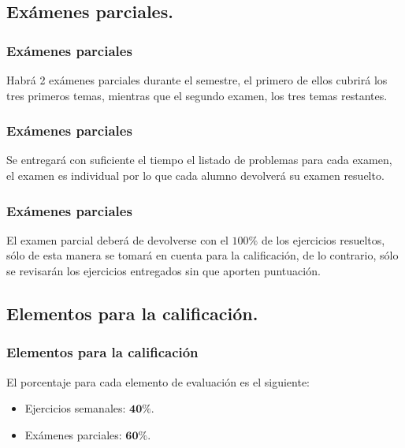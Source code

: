 \subsection{Exámenes parciales.}
\begin{frame}
\frametitle{Exámenes parciales}
Habrá 2 exámenes parciales durante el semestre, el primero de ellos cubrirá los tres primeros temas, mientras que el segundo examen, los tres temas restantes.
\end{frame}
\begin{frame}
\frametitle{Exámenes parciales}
Se entregará con suficiente el tiempo el listado de problemas para cada examen, el examen es individual por lo que cada alumno devolverá su examen resuelto.
\end{frame}
\begin{frame}
\frametitle{Exámenes parciales}
El examen parcial deberá de devolverse con el $100\%$ de los ejercicios resueltos, sólo de esta manera se tomará en cuenta para la calificación, de lo contrario, sólo se revisarán los ejercicios entregados sin que aporten puntuación.
\end{frame}
\subsection{Elementos para la calificación.}
\begin{frame}
\frametitle{Elementos para la calificación}
El porcentaje para cada elemento de evaluación es el siguiente:
\begin{itemize}
\setlength{\itemsep}{0mm}
\item Ejercicios semanales: $\mathbf{40\%}$.
\item Exámenes parciales: $\mathbf{60\%}$.
\end{itemize}
\end{frame}
